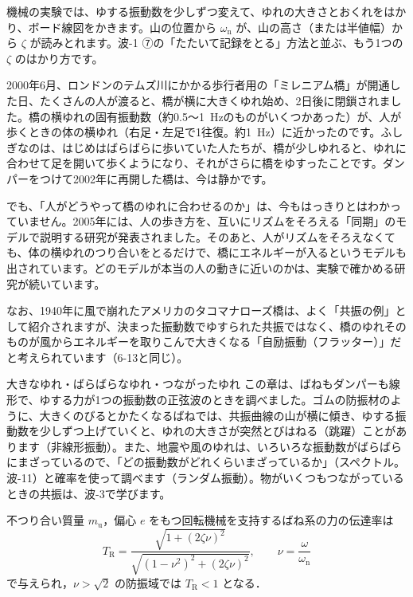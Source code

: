 機械の実験では、ゆする振動数を少しずつ変えて、ゆれの大きさとおくれをはかり、ボード線図をかきます。山の位置から $\omega_{\mathrm n}$ が、山の高さ（または半値幅）から $\zeta$ が読みとれます。波-1 ⑦の「たたいて記録をとる」方法と並ぶ、もう1つの $\zeta$ のはかり方です。

\begin{phmada}
2000年6月、ロンドンのテムズ川にかかる歩行者用の「ミレニアム橋」が開通した日、たくさんの人が渡ると、橋が横に大きくゆれ始め、2日後に閉鎖されました。橋の横ゆれの固有振動数（約0.5〜\qty{1}{Hz}のものがいくつかあった）が、人が歩くときの体の横ゆれ（右足・左足で1往復。約\qty{1}{Hz}）に近かったのです。ふしぎなのは、はじめはばらばらに歩いていた人たちが、橋が少しゆれると、ゆれに合わせて足を開いて歩くようになり、それがさらに橋をゆすったことです。ダンパーをつけて2002年に再開した橋は、今は静かです。

でも、「人がどうやって橋のゆれに合わせるのか」は、今もはっきりとはわかっていません。2005年には、人の歩き方を、互いにリズムをそろえる「同期」のモデルで説明する研究が発表されました。そのあと、人がリズムをそろえなくても、体の横ゆれのつり合いをとるだけで、橋にエネルギーが入るというモデルも出されています。どのモデルが本当の人の動きに近いのかは、実験で確かめる研究が続いています。

なお、1940年に風で崩れたアメリカのタコマナローズ橋は、よく「共振の例」として紹介されますが、決まった振動数でゆすられた共振ではなく、橋のゆれそのものが風からエネルギーを取りこんで大きくなる「自励振動（フラッター）」だと考えられています（6-13と同じ）。
\end{phmada}

\begin{phsaki}{大きなゆれ・ばらばらなゆれ・つながったゆれ}
この章は、ばねもダンパーも線形で、ゆする力が1つの振動数の正弦波のときを調べました。ゴムの防振材のように、大きくのびるとかたくなるばねでは、共振曲線の山が横に傾き、ゆする振動数を少しずつ上げていくと、ゆれの大きさが突然とびはねる（跳躍）ことがあります（非線形振動）。また、地震や風のゆれは、いろいろな振動数がばらばらにまざっているので、「どの振動数がどれくらいまざっているか」（スペクトル。波-11）と確率を使って調べます（ランダム振動）。物がいくつもつながっているときの共振は、波-3で学びます。
\end{phsaki}

\begin{senmonsho}[機械力学の専門書の書き方]
\begin{bkhonbun}
不つり合い質量 $m_{\mathrm u}$，偏心 $e$ をもつ回転機械を支持するばね系の力の伝達率は
\[ T_{\mathrm R}=\frac{\sqrt{1+(2\zeta\nu)^2}}{\sqrt{(1-\nu^2)^2+(2\zeta\nu)^2}},\qquad \nu=\frac{\omega}{\omega_{\mathrm n}} \]
で与えられ，$\nu>\sqrt2$ の防振域では $T_{\mathrm R}<1$ となる．
\end{bkhonbun}
\end{senmonsho}

